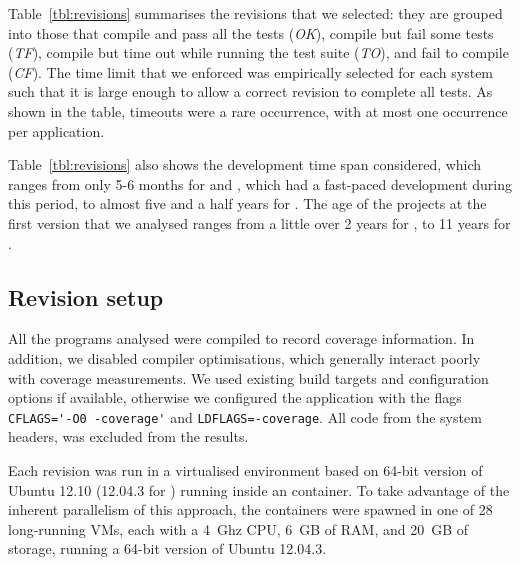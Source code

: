 Table~\ref{tbl:revisions} summarises the revisions that we selected:
they are grouped into those that compile and pass all the tests (\emph{OK}),
compile but fail some tests (\emph{TF}), compile but time out while running the
test suite (\emph{TO}), and fail to compile (\emph{CF}).  The time limit that
we enforced was empirically selected for each system such that it is large
enough to allow a correct revision to complete all tests. As shown in the
table, timeouts were a rare occurrence, with at most one occurrence per
application.

Table~\ref{tbl:revisions} also shows the development time span considered,
which ranges from only 5-6 months for \git and \redis, which had a fast-paced
development during this period, to almost five and a half years for \memcached.
The age of the projects at the first version that we analysed ranges from a
little over 2 years for \lighttpdtwo, to 11 years for \binutils.

\subsection{Revision setup}

All the programs analysed were compiled to record coverage information. In
addition, we disabled compiler optimisations, which generally interact poorly
with coverage measurements. We used existing build targets and configuration
options if available, otherwise we configured the application with the flags
\lstinline`CFLAGS='-O0 -coverage'` and \lstinline`LDFLAGS=-coverage`. All code
from the system headers, \ie {} was excluded from the results.

Each revision was run in a virtualised environment based on 64-bit version of
Ubuntu 12.10 (12.04.3 for \git) running inside an \lxc container.  To take
advantage of the inherent parallelism of this approach, the containers were
spawned in one of 28 long-running \xen VMs, each with a 4~Ghz CPU, 6~GB of RAM,
and 20~GB of storage, running a 64-bit version of Ubuntu 12.04.3.

